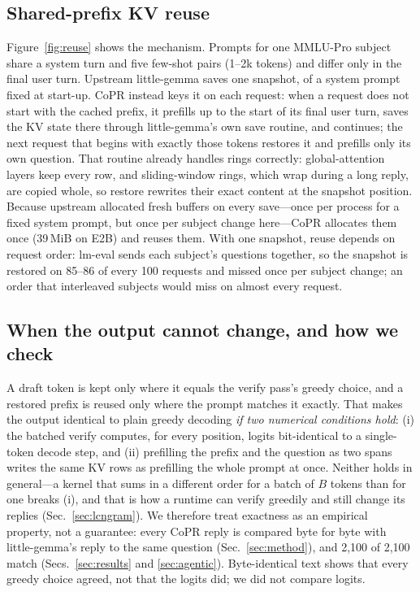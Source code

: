 \documentclass[lettersize,journal]{IEEEtran}
\newcommand{\sys}{CoPR}
\newcommand{\lgm}{little-gemma}
\begin{document}
\subsection{Shared-prefix KV reuse}
Figure~\ref{fig:reuse} shows the mechanism. Prompts for one MMLU-Pro subject share a system turn and five few-shot pairs
(1--2k tokens) and differ only in the final user turn. Upstream \lgm{} saves one
snapshot, of a system prompt fixed at start-up. \sys{} instead keys it on each
request: when a request does not start with the cached prefix, it prefills up
to the start of its final user turn, saves the KV state there through
\lgm{}'s own save routine, and continues; the next request that begins with
exactly those tokens restores it and prefills only its own question. That
routine already handles rings correctly: global-attention layers keep every
row, and sliding-window rings, which wrap during a long reply, are copied whole,
so restore rewrites their exact content at the snapshot position. Because
upstream allocated fresh buffers on every save---once per process for a fixed
system prompt, but once per subject change here---\sys{} allocates them once
(39\,MiB on E2B) and reuses them. With one snapshot, reuse depends on request
order: lm-eval sends each subject's questions together, so the snapshot is
restored on 85--86 of every 100 requests and missed once per subject change; an
order that interleaved subjects would miss on almost every request.

\subsection{When the output cannot change, and how we check}
A draft token is kept only where it equals the verify pass's greedy choice, and
a restored prefix is reused only where the prompt matches it exactly. That
makes the output identical to plain greedy decoding \emph{if two numerical
conditions hold}: (i) the batched verify computes, for every position, logits
bit-identical to a single-token decode step, and (ii) prefilling the prefix and
the question as two spans writes the same KV rows as prefilling the whole
prompt at once. Neither holds in general---a kernel that sums in a different
order for a batch of $B$ tokens than for one breaks (i), and that is how a
runtime can verify greedily and still change its replies
(Sec.~\ref{sec:lcngram}). We therefore treat exactness as an empirical
property, not a guarantee: every \sys{} reply is compared byte for byte with
\lgm{}'s reply to the same question (Sec.~\ref{sec:method}), and 2{,}100 of
2{,}100 match (Secs.~\ref{sec:results} and \ref{sec:agentic}). Byte-identical text shows that every greedy choice
agreed, not that the logits did; we did not compare logits.
\end{document}

